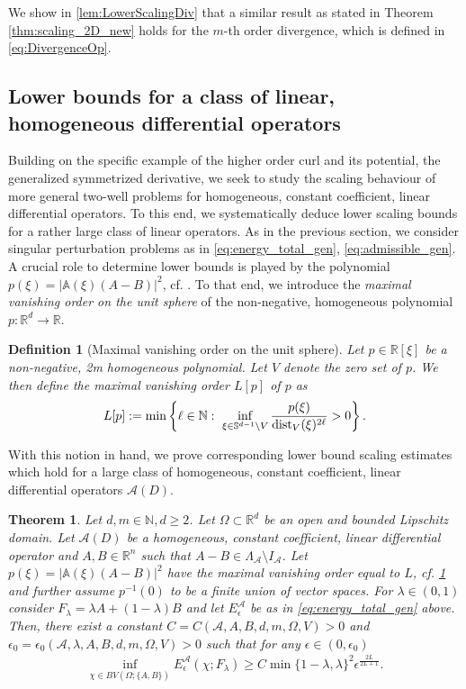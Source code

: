 \documentclass[a4paper, 10pt, twoside, notitlepage]{amsart}
\theoremstyle{plain}
\newtheorem{thm}{Theorem}
\newtheorem{defi}[prop]{Definition}
\newcommand{\R}{\mathbb{R}}
\newcommand{\N}{\mathbb{N}}
\newcommand{\A}{\mathcal{A}}
\renewcommand{\AA}{\mathbb{A}}
\begin{document}
        We show in \cref{lem:LowerScalingDiv} that a similar result as stated in Theorem \ref{thm:scaling_2D_new} holds for the $m$-th order divergence, which is defined in \eqref{eq:DivergenceOp}.
                  
	
	\subsection{Lower bounds for a class of linear, homogeneous differential operators}
	Building on the specific example of the higher order curl and its potential, the generalized symmetrized derivative, we seek to study the scaling behaviour of more general two-well problems for homogeneous, constant coefficient,
	linear differential operators. To this end, we systematically deduce lower scaling bounds for a rather large class of linear operators. As in the previous section, we consider singular perturbation problems as in \eqref{eq:energy_total_gen},
	\eqref{eq:admissible_gen}. A crucial role to determine lower bounds is played by the polynomial $p(\xi) = |\AA(\xi)(A-B)|^2$, cf. \cite[Corollary 3.2]{RRT22}.	
	To that end, we introduce the \emph{maximal vanishing order on the unit sphere} of the non-negative, homogeneous polynomial $p:\R^d \to \R$.
	
	\begin{defi}[Maximal vanishing order on the unit sphere]
		\label{defi:index}
		Let $p \in \R[\xi]$ be a non-negative, 2m homogeneous polynomial. Let $V$ denote the zero set of $p$. We then define the \emph{maximal vanishing order} $L[p]$ of $p$ as
		\begin{align*}
			L[p]:= \min\left\{\ell \in \N: \ \inf\limits_{\xi \in \mathbb{S}^{d-1} \setminus V} \frac{p(\xi)}{\dist_V(\xi)^{2\ell}}>0 \right\}.
		\end{align*}
	\end{defi}
	
	With this notion in hand, we prove corresponding lower bound scaling estimates which hold for a large class of homogeneous, constant coefficient, linear differential operators $\A(D)$.
	
	\begin{thm}\label{thm:lower_bound_p}
		Let $d, m \in \N, d \geq 2$. Let $\Omega \subset \R^d$ be an open and bounded Lipschitz domain.  Let $\A(D)$ be a homogeneous, constant coefficient, linear differential operator and $A,B \in \R^n$ such that
		$A-B \in \Lambda_{\A} \setminus I_{\A}$. Let $p(\xi)=|\AA(\xi)(A-B)|^2$ have the maximal vanishing order equal to $L$, cf. \cref{defi:index} and further assume $p^{-1}(0)$ to be a finite union of vector spaces. For $\lambda \in (0,1)$ consider $F_\lambda = \lambda A + (1-\lambda)B$ and let $E^{\A}_{\epsilon}$ be as in
		\eqref{eq:energy_total_gen} above. Then, there exist a constant $C=C(\A, A, B, d, m, \Omega, V)>0$ and $\epsilon_0 = \epsilon_0(\A,\lambda,A,B,d,m,\Omega,V) > 0$ such that for any $\epsilon \in (0,\epsilon_0)$
		\begin{align*}
			\inf\limits_{\chi \in BV(\Omega;\{A,B\})}  E_{\epsilon}^{\A}(\chi;F_\lambda) \geq C \min\{1-\lambda,\lambda\}^2 \epsilon^{\frac{2L}{2L+1}}.
		\end{align*}
	\end{thm}
	
\end{document}
